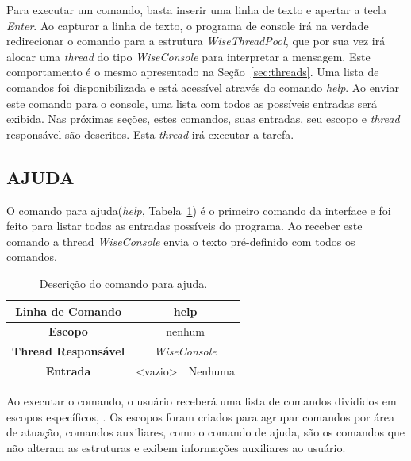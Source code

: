 Para executar um comando, basta inserir uma linha de texto e apertar a tecla \textit{Enter}.  Ao capturar a linha de texto, o programa de console irá na verdade redirecionar o comando para a estrutura \textit{WiseThreadPool}, que por sua vez irá alocar uma \textit{thread} do tipo \textit{WiseConsole} para interpretar a mensagem. Este comportamento é o mesmo apresentado na Seção~\ref{sec:threads}. Uma lista de comandos foi disponibilizada e está acessível através do comando \textit{help}. Ao enviar este comando para o console, uma lista com todos as possíveis entradas será exibida. Nas próximas seções, estes comandos, suas entradas, seu escopo e \textit{thread} responsável são descritos. Esta \textit{thread} irá executar a tarefa. 

\subsection{AJUDA}\label{sec:help}

O comando para ajuda(\textit{help}, Tabela~\ref{tab:help}) é o primeiro comando da interface e foi feito para listar todas as entradas possíveis do programa. Ao receber este comando a thread \textit{WiseConsole} envia o texto pré-definido com todos os comandos.

\begin{center}
	\begin{table}[!htbp]
		\begin{tabularx}{\textwidth}{c|c|X}
			\toprule
			\textbf{Linha de Comando} & \multicolumn{2}{c}{help} \\
			\midrule
			\textbf{Escopo} & \multicolumn{2}{c}{nenhum} \\
			\hline
			\textbf{Thread Responsável} & \multicolumn{2}{c}{\textit{WiseConsole}} \\
			\hline
			\textbf{Entrada} & <vazio> & Nenhuma \\
			\bottomrule
		\end{tabularx}
		\caption{Descrição do comando para ajuda.}
		\label{tab:help}
	\end{table}
\end{center}

Ao executar o comando, o usuário receberá uma lista de comandos divididos em escopos específicos, . Os escopos foram criados para agrupar comandos por área de atuação, comandos auxiliares, como o comando de ajuda, são os comandos que não alteram as estruturas e exibem informações auxiliares ao usuário.



